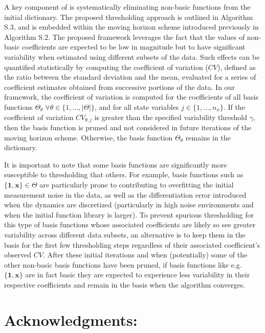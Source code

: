 \documentclass[12pt]{article}
\begin{document}
A key component of \ours{} is systematically eliminating non-basic functions from the initial dictionary. The proposed thresholding approach is outlined in Algorithm S.3, and is embedded within the moving horizon  scheme introduced previously in Algorithm S.2. The proposed framework leverages the fact that the values of non-basic coefficients are expected to be low in magnitude but to have significant variability when estimated using different subsets of the data. Such effects can be quantified statistically by computing the coefficient of variation ($CV$), defined as the ratio between the standard deviation and the mean, evaluated for a series of coefficient estimates obtained from successive portions of the data. In our framework, the coefficient of variation is computed for the coefficients of all basis functions $\Theta_\theta \; \forall \theta \in \{1,\dots,|\Theta |\}$, and for all state variables $j\in\{1,\dots,n_x\}$. If the coefficient of variation $CV_{\theta,j}$ is greater than the specified variability threshold $\gamma$, then the basis function is pruned and not considered in future iterations of the moving horizon scheme. Otherwise, the basis function $\Theta_\theta$ remains in the dictionary.

It is important to note that some basis functions are significantly more susceptible to thresholding that others. For example, basis functions such as  $\{\pmb{1}, \textbf{x}\} \in \Theta$ are particularly prone to contributing to overfitting the initial measurement noise in the data, as well as the differentiation error introduced when the dynamics are discretized (particularly in high noise environments and when the initial function library is larger). To prevent spurious thresholding for this type of basis functions whose associated coefficients are likely so see greater variability across different data subsets, an alternative is to keep them in the basis for the first few thresholding steps regardless of their associated coefficient's observed $CV$. After these initial iterations and when (potentially) some of the other non-basic basis functions have been pruned, if basis functions like e.g. $\{\pmb{1}, \pmb{x}\}$ are in fact basic they are expected to experience less variability in their respective coefficients and remain in the basis when the algorithm converges.










\section*{Acknowledgments:}
\end{document}
